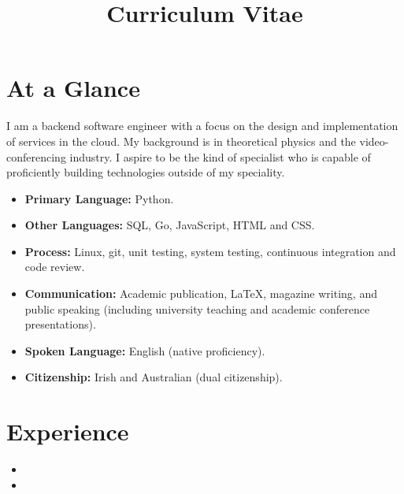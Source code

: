 \documentclass[11pt,a4paper,sans]{moderncv}        %
\title{Curriculum Vitae}
\begin{document}
\makecvtitle

\vspace{-0.9cm}

\section{At a Glance}
I am a backend software engineer with a focus on the design and implementation of services in the cloud. My background is in theoretical physics and the video-conferencing industry. I aspire to be the kind of specialist who is capable of proficiently building technologies outside of my speciality.

\begin{itemize}
\item{\textbf{Primary Language:} Python.}
\item{\textbf{Other Languages:} SQL, Go, JavaScript, HTML and CSS.}
\item{\textbf{Process:} Linux, git, unit testing, system testing, continuous integration and code review.}
\item{\textbf{Communication:} Academic publication, \LaTeX, magazine writing,  and public speaking (including university teaching and academic conference presentations).}
\item {\textbf{Spoken Language:} English (native proficiency).}
\item {\textbf{Citizenship:} Irish and Australian (dual citizenship).}
\end{itemize}

\vspace{5pt}

\section{Experience}
\begin{itemize}
\item{}

\item{}

\end{itemize}
\end{document}

